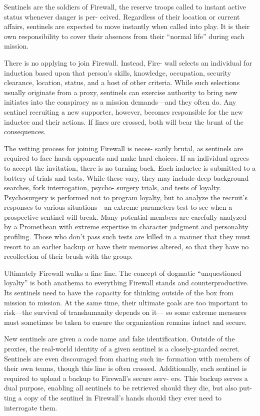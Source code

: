 Sentinels are the soldiers of Firewall, the reserve troops 
called to instant active status whenever danger is per-
ceived. Regardless of their location or current affairs, 
sentinels are expected to move instantly when called 
into play. It is their own responsibility to cover their 
absences from their ``normal life'' during each mission. 

There is no applying to join Firewall. Instead, Fire-
wall selects an individual for induction based upon 
that person's skills, knowledge, occupation, security 
clearance, location, status, and a host of other criteria. 
While such selections usually originate from a proxy, 
sentinels can exercise authority to bring new initiates 
into the conspiracy as a mission demands—and they 
often do. Any sentinel recruiting a new supporter, 
however, becomes responsible for the new inductee 
and their actions. If lines are crossed, both will bear 
the brunt of the consequences. 

The vetting process for joining Firewall is neces-
sarily brutal, as sentinels are required to face harsh 
opponents and make hard choices. If an individual 
agrees to accept the invitation, there is no turning 
back. Each inductee is submitted to a battery of trials 
and tests. While these vary, they may include deep 
background searches, fork interrogation, psycho-
surgery trials, and tests of loyalty. Psychosurgery is 
performed not to program loyalty, but to analyze the 
recruit's responses to various situations—an extreme 
parameters test to see when a prospective sentinel 
will break. Many potential members are carefully 
analyzed by a Promethean with extreme expertise in 
character judgment and personality profiling. Those 
who don't pass such tests are killed in a manner that 
they must resort to an earlier backup or have their 
memories altered, so that they have no recollection of 
their brush with the group.

Ultimately Firewall walks a fine line. The concept 
of dogmatic ``unquestioned loyalty'' is both anathema 
to everything Firewall stands and counterproductive. 
Its sentinels need to have the capacity for thinking 
outside of the box from mission to mission. At the 
same time, their ultimate goals are too important to 
risk—the survival of transhumanity depends on it—
so some extreme measures must sometimes be taken 
to ensure the organization remains intact and secure.

New sentinels are given a code name and fake 
identification. Outside of the proxies, the real-world 
identity of a given sentinel is a closely-guarded secret. 
Sentinels are even discouraged from sharing such in-
formation with members of their own teams, though 
this line is often crossed. Additionally, each sentinel is 
required to upload a backup to Firewall's secure serv-
ers. This backup serves a dual purpose, enabling all 
sentinels to be retrieved should they die, but also put-
ting a copy of the sentinel in Firewall's hands should 
they ever need to interrogate them.

